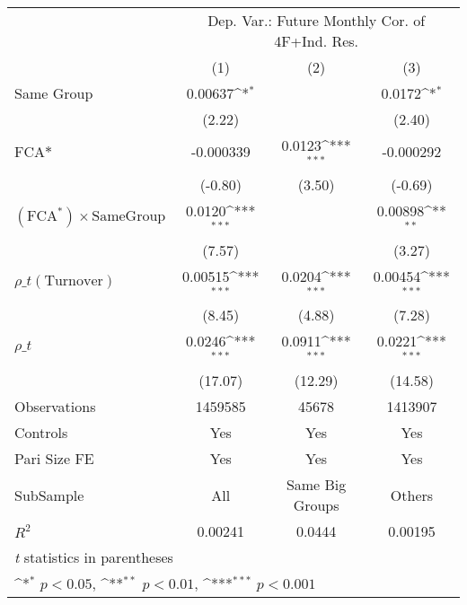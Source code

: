 {
\def\sym#1{\ifmmode^{#1}\else\(^{#1}\)\fi}
\begin{tabular}{l*{3}{c}}
\hline\hline
                &\multicolumn{3}{c}{Dep. Var.: Future Monthly Cor.  of 4F+Ind. Res.}\\\cmidrule(lr){2-4}
                &\multicolumn{1}{c}{(1)}         &\multicolumn{1}{c}{(2)}         &\multicolumn{1}{c}{(3)}         \\
\hline
Same Group      &  0.00637\sym{*}  &                  &   0.0172\sym{*}  \\
                &   (2.22)         &                  &   (2.40)         \\
[1em]
$ \text{FCA*} $ &-0.000339         &   0.0123\sym{***}&-0.000292         \\
                &  (-0.80)         &   (3.50)         &  (-0.69)         \\
[1em]
 $ (\text{FCA}^*) \times {\text{SameGroup} }  $ &   0.0120\sym{***}&                  &  0.00898\sym{**} \\
                &   (7.57)         &                  &   (3.27)         \\
[1em]
 $ {\rho\_t(\text{Turnover})} $ &  0.00515\sym{***}&   0.0204\sym{***}&  0.00454\sym{***}\\
                &   (8.45)         &   (4.88)         &   (7.28)         \\
[1em]
 $ {\rho\_t} $   &   0.0246\sym{***}&   0.0911\sym{***}&   0.0221\sym{***}\\
                &  (17.07)         &  (12.29)         &  (14.58)         \\
\hline
Observations    &  1459585         &    45678         &  1413907         \\
Controls        &      Yes         &      Yes         &      Yes         \\
Pari Size FE    &      Yes         &      Yes         &      Yes         \\
SubSample       &      All         &Same Big Groups         &   Others         \\
$ R^2$          &  0.00241         &   0.0444         &  0.00195         \\
\hline\hline
\multicolumn{4}{l}{\footnotesize \textit{t} statistics in parentheses}\\
\multicolumn{4}{l}{\footnotesize \sym{*} \(p<0.05\), \sym{**} \(p<0.01\), \sym{***} \(p<0.001\)}\\
\end{tabular}
}
